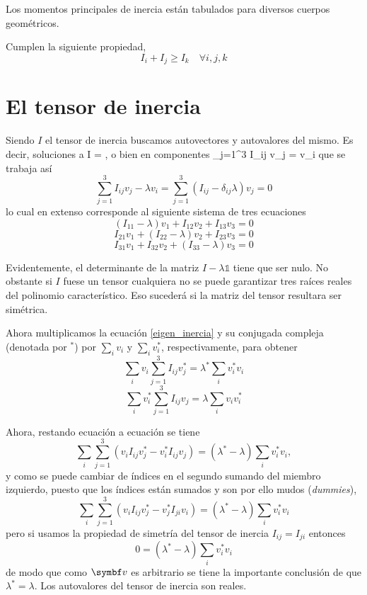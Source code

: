 \documentclass[10pt,oneside]{CBFT_book}
\begin{document}
Los momentos principales de inercia están tabulados para diversos cuerpos geométricos.


Cumplen la siguiente propiedad,
\[
	I_i + I_j \geq I_k \quad \forall i,j,k
\]

\section{El tensor de inercia}

Siendo $I$ el tensor de inercia buscamos autovectores y autovalores del mismo. 
Es decir, soluciones a
\be
	I  = \lambda {},
	\label{autovalores_inercia}
\ee
o bien en componentes
\be
	 \sum_{j=1}^3 I_{ij} v_j = \lambda v_i
\label{eigen_inercia}	 
\ee
que se trabaja así
\[
	 \sum_{j=1}^3 I_{ij} v_j - \lambda v_i =  \sum_{j=1}^3 ( I_{ij} - \delta_{ij}\lambda ) v_j = 0
\]
lo cual en extenso corresponde al siguiente sistema de tres ecuaciones
\[
	(I_{11} - \lambda)v_1 + I_{12} v_2 + I_{13} v_3 = 0
\]
\[
	I_{21} v_1 + (I_{22} - \lambda) v_2 + I_{23} v_3 = 0
\]
\[
	I_{31} v_1 + I_{32} v_2 + (I_{33} - \lambda) v_3 = 0
\]

Evidentemente, el determinante de la matriz $ I - \lambda \mathbb{1}$ tiene que ser nulo.
No obstante si $I$ fuese un tensor cualquiera no se puede garantizar tres raíces reales del polinomio
característico. Eso sucederá si la matriz del tensor resultara ser simétrica.

Ahora multiplicamos la ecuación \eqref{eigen_inercia} y su conjugada compleja (denotada por $^*$) por
$\sum_i v_i$ y $\sum_i v_i^*$, respectivamente, para obtener
\[
	\sum_i v_i \sum_{j=1}^3 I_{ij} v_j^* = \lambda^* \sum_i v_i^*  v_i
\]
\[
	\sum_i v_i^* \sum_{j=1}^3 I_{ij} v_j = \lambda \sum_i v_i v_i^*
\]

Ahora, restando ecuación a ecuación se tiene
\[
	\sum_i \sum_{j=1}^3 ( v_i I_{ij} v_j^* - v_i^* I_{ij} v_j ) =
	(\lambda^* - \lambda )\sum_i v_i^* v_i ,
\]
y como se puede cambiar de índices en el segundo sumando del miembro izquierdo, puesto que los índices están sumados y son
por ello mudos ({\it dummies}),
\[
	\sum_i \sum_{j=1}^3 ( v_i I_{ij} v_j^* - v_j^* I_{ji} v_i ) =
	(\lambda^* - \lambda )\sum_i v_i^* v_i 
\]
pero si usamos la propiedad de simetría del tensor de inercia $I_{ij}=I_{ji}$ entonces
\[
	0 = (\lambda^* - \lambda )\sum_i v_i^* v_i 
\]
de modo que como $\vb{v}$ es arbitrario se tiene la importante conclusión de que $\lambda^* = \lambda$.
Los autovalores del tensor de inercia son reales.
\end{document}

